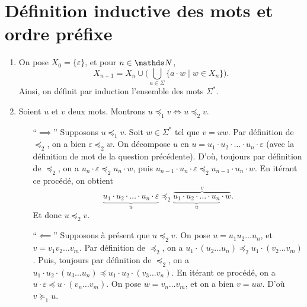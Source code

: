 \section{Définition inductive des mots et ordre préfixe}

\begin{enumerate}
	\item On pose $X_0 = \{\varepsilon\}$, et pour $n \in \N$, \[
			X_{n+1} = X_n \cup \Big( \bigcup_{a \in \Sigma} \{ a\cdot w  \mid w \in X_n \}\Big)
		.\]
		Ainsi, on définit par induction l'ensemble des mots $\Sigma^*$.
	\item Soient $u$\/ et $v$\/ deux mots. Montrons $u \preceq_1 v \iff u \preceq_2 v$.
		\begin{itemize}
			\item[``$\implies$''] Supposons $u \preceq_1 v$. Soit $w \in \Sigma^*$\/ tel que $v = u w$. Par définition de $\preceq_2$, on a bien $\varepsilon \preceq_2 w$. On décompose $u$\/ en $u = u_1 \cdot u_2 \cdot \ldots \cdot u_n \cdot \varepsilon$\/ (avec la définition de mot de la question précédente). D'où, toujours par définition de $\preceq_2$, on a $u_n \cdot \varepsilon \preceq_2 u_n \cdot w$, puis $u_{n-1}\cdot u_n \cdot \varepsilon \preceq_2 u_{n-1}\cdot u_n \cdot w$. En itérant ce procédé, on obtient \[\underbrace{u_1 \cdot u_2 \cdot \ldots \cdot u_n \cdot \varepsilon}_{u} \preceq_2 \overbrace{{\underbrace{u_1 \cdot u_2 \cdot \ldots \cdot u_n}_u} \cdot w}^{v}.\]
				Et donc $u \preceq_2 v$.
			\item[``$\impliedby$''] Supposons à présent que $u \preceq_2 v$. On pose $u = u_1 u_2 \ldots u_n$, et $v = v_1v_2\ldots v_{m}$. Par définition de $\preceq_2$, on a $u_1 \cdot (u_2\ldots u_n) \preceq_2 u_1 \cdot (v_2 \ldots v_m)$. Puis, toujours par définition de $\preceq_2$, on a $u_1 \cdot u_2 \cdot (u_3\ldots u_n) \preceq u_1 \cdot u_2 \cdot (v_3\ldots v_n)$. En itérant ce procédé, on a $u \cdot \varepsilon \preceq u \cdot (v_n \ldots v_m)$. On pose $w = v_n \ldots v_m$, et on a bien $v = uw$. D'où $v \succeq_1 u$.
		\end{itemize}
\end{enumerate}


